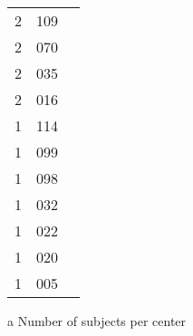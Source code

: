 \documentclass{elsarticle}
\begin{document}
\begin{table}[]
\begin{threeparttable}
\begin{tabular}{ccl}
		2 & 109 &  \\   
		2 & 070 &  \\   
		2 & 035 &  \\   
		2 & 016 &  \\   
		1 & 114 &  \\   
		1 & 099 &  \\   
		1 & 098 &  \\   
		1 & 032 &  \\   
		1 & 022 &  \\   
		1 & 020 &  \\   
		1 & 005 &  \\   
      \bottomrule
    \end{tabular}
    \begin{tablenotes}
      \item[a]{Number of subjects per center}
    \end{tablenotes}
  \end{threeparttable}
\end{table}
\end{document}
